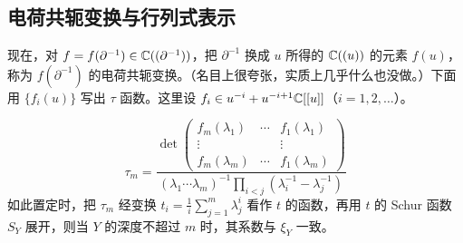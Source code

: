 
\subsection{电荷共轭变换与行列式表示}

现在，对 $f=f(\partial^{-1})\in\mathbb{C}((\partial^{-1}))$，把 $\partial^{-1}$ 换成 $u$ 所得的 $\mathbb{C}((u))$ 的元素 $f(u)$，称为 $f(\partial^{-1})$ 的电荷共轭变换。（名目上很夸张，实质上几乎什么也没做。）下面用 $\{f_i(u)\}$ 写出 $\tau$ 函数。这里设 $f_i\in u^{-i}+u^{-i+1}\mathbb{C}[[u]]$（$i=1,2,\dots$）。

\begin{lemma}
\[
\tau_m=
\frac{\det
\begin{pmatrix}
f_m(\lambda_1) & \cdots & f_1(\lambda_1)\\
\vdots & & \vdots\\
f_m(\lambda_m) & \cdots & f_1(\lambda_m)
\end{pmatrix}}
{(\lambda_1\cdots\lambda_m)^{-1}\prod_{i<j}(\lambda_i^{-1}-\lambda_j^{-1})}
\]
如此置定时，把 $\tau_m$ 经变换 $t_i=\frac{1}{i}\sum_{j=1}^m\lambda_j^i$ 看作 $t$ 的函数，再用 $t$ 的 Schur 函数 $S_Y$ 展开，则当 $Y$ 的深度不超过 $m$ 时，其系数与 $\xi_Y$ 一致。
\end{lemma}

